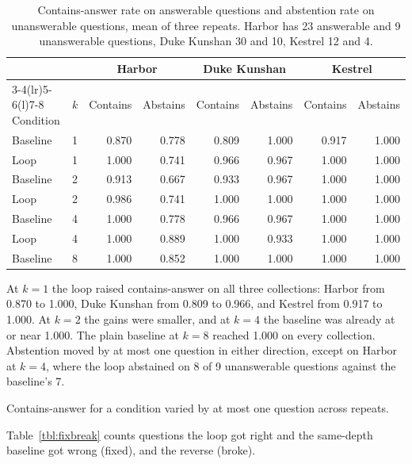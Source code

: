 \documentclass[12pt, a4paper, oneside]{report}
\begin{document}
\begin{table}[htbp]
\centering
\footnotesize
\setlength{\tabcolsep}{4pt}
\begin{tabular}{@{}llrrrrrr@{}}
\toprule
 & & \multicolumn{2}{c}{Harbor} & \multicolumn{2}{c}{Duke Kunshan} & \multicolumn{2}{c}{Kestrel} \\
\cmidrule(lr){3-4}\cmidrule(lr){5-6}\cmidrule(l){7-8}
Condition & $k$ & Contains & Abstains & Contains & Abstains & Contains & Abstains \\
\midrule
Baseline & 1 & 0.870 & 0.778 & 0.809 & 1.000 & 0.917 & 1.000 \\
Loop     & 1 & 1.000 & 0.741 & 0.966 & 0.967 & 1.000 & 1.000 \\
Baseline & 2 & 0.913 & 0.667 & 0.933 & 0.967 & 1.000 & 1.000 \\
Loop     & 2 & 0.986 & 0.741 & 1.000 & 1.000 & 1.000 & 1.000 \\
Baseline & 4 & 1.000 & 0.778 & 0.966 & 0.967 & 1.000 & 1.000 \\
Loop     & 4 & 1.000 & 0.889 & 1.000 & 0.933 & 1.000 & 1.000 \\
Baseline & 8 & 1.000 & 0.852 & 1.000 & 1.000 & 1.000 & 1.000 \\
\bottomrule
\end{tabular}
\caption{Contains-answer rate on answerable questions and abstention rate on
unanswerable questions, mean of three repeats. Harbor has 23 answerable and
9 unanswerable questions, Duke Kunshan 30 and 10, Kestrel 12 and 4.}
\label{tbl:sweep}
\end{table}

At $k=1$ the loop raised contains-answer on all three collections: Harbor
from 0.870 to 1.000, Duke Kunshan from 0.809 to 0.966, and Kestrel from
0.917 to 1.000. At $k=2$ the gains were smaller, and at $k=4$ the baseline
was already at or near 1.000. The plain baseline at $k=8$ reached 1.000 on
every collection. Abstention moved by at most one question in either
direction, except on Harbor at $k=4$, where the loop abstained on 8 of 9
unanswerable questions against the baseline's 7.

Contains-answer for a condition varied by at most one question across
repeats.

Table~\ref{tbl:fixbreak} counts questions the loop got right and the
same-depth baseline got wrong (fixed), and the reverse (broke).
\end{document}
